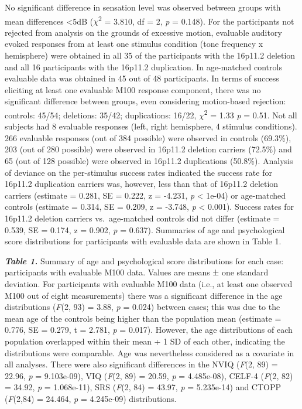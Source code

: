 \documentclass[]{article}
\begin{document}
No significant difference in sensation level was observed between groups
with mean differences \textless{}5dB (\(\chi\)\textsuperscript{2} =
3.810, df = 2, \emph{p} = 0.148). For the participants not rejected from
analysis on the grounds of excessive motion, evaluable auditory evoked
responses from at least one stimulus condition (tone frequency x
hemisphere) were obtained in all 35 of the participants with the 16p11.2
deletion and all 16 participants with the 16p11.2 duplication. In
age-matched controls evaluable data was obtained in 45 out of 48
participants. In terms of success eliciting at least one evaluable M100
response component, there was no significant difference between groups,
even considering motion-based rejection: controls: 45/54; deletions:
35/42; duplications: 16/22, \(\chi\)\textsuperscript{2} = 1.33 \emph{p}
= 0.51. Not all subjects had 8 evaluable responses (left, right
hemisphere, 4 stimulus conditions). 266 evaluable responses (out of 384
possible) were observed in controls (69.3\%), 203 (out of 280 possible)
were observed in 16p11.2 deletion carriers (72.5\%) and 65 (out of 128
possible) were observed in 16p11.2 duplications (50.8\%). Analysis of
deviance on the per-stimulus success rates indicated the success rate
for 16p11.2 duplication carriers was, however, less than that of 16p11.2
deletion carriers (estimate = 0.281, SE = 0.222, z = -4.231, \emph{p}
\textless{} 1e-04) or age-matched controls (estimate = 0.314, SE =
0.209, z = -3.748, \emph{p} \textless{} 0.001). Success rates for
16p11.2 deletion carriers vs.~age-matched controls did not differ
(estimate = 0.539, SE = 0.174, z = 0.902, \emph{p} = 0.637). Summaries
of age and psychological score distributions for participants with
evaluable data are shown in Table 1.

\medskip

\medskip

\textbf{\emph{Table 1.}} Summary of age and psychological score
distributions for each case: participants with evaluable M100 data.
Values are means ± one standard deviation. For participants with
evaluable M100 data (i.e., at least one observed M100 out of eight
measurements) there was a significant difference in the age
distributions (\emph{F}(2, 93) = 3.88, \emph{p} = 0.024) between cases;
this was due to the mean age of the controls being higher than the
population mean (estimate = 0.776, SE = 0.279, t = 2.781, \emph{p} =
0.017). However, the age distributions of each population overlapped
within their mean + 1 SD of each other, indicating the distributions
were comparable. Age was nevertheless considered as a covariate in all
analyses. There were also significant differences in the NVIQ
(\emph{F}(2, 89) = 22.96, \emph{p} = 9.103e-09), VIQ (\emph{F}(2, 89) =
20.59, \emph{p} = 4.485e-08), CELF-4 (\emph{F}(2, 82) = 34.92, \emph{p}
= 1.068e-11), SRS (\emph{F}(2, 84) = 43.97, \emph{p} = 5.235e-14) and
CTOPP (\emph{F}(2,84) = 24.464, \emph{p} = 4.245e-09) distributions.
\end{document}
